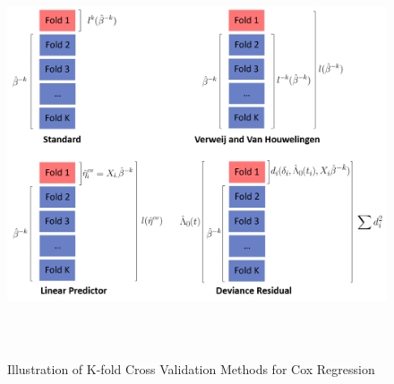 
\begin{figure}
  \centering
  \includegraphics[height= 12cm ]{./manuscript_figure/figure_1_new.png}
  \caption{Illustration of K-fold Cross Validation Methods for Cox Regression}
\end{figure}	

